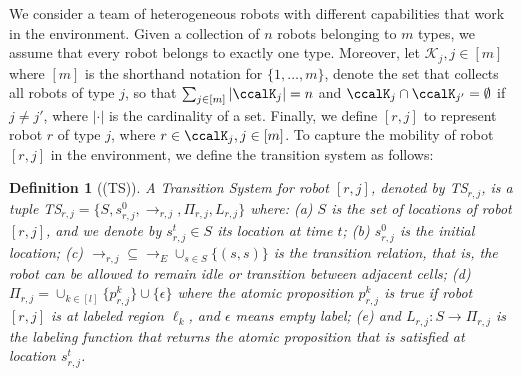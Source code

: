 \documentclass[Afour,sageh,times]{sagej}
\newtheorem{defn}[thm]{Definition}
\begin{document}
 We consider a team of heterogeneous robots with different capabilities that work in the environment. Given a collection of $n$ robots belonging to $m$ types, we assume that every robot belongs to exactly one type. Moreover, let $\mathcal{K}_j, j\in[m]$ where $[m]$ is the shorthand notation for  $\{1,\ldots,m\}$, denote the set that  collects all robots of type $j$, so that $\sum_{j\in [m]} |\ccalK_j| = n$ and $\ccalK_{j} \cap \ccalK_{j'} = \emptyset$ if $j \not= j'$, where $|\cdot|$ is the cardinality of a set. Finally, we define $[r,j]$ to represent robot $r$ of type $j$, where $r\in \ccalK_j, j\in [m]$. To capture the mobility of robot $[r,j]$ in the environment, we define the transition system as follows:

\begin{defn}[(TS)]\label{def:ts}
  A { Transition System} for robot $[r,j]$, denoted by TS$_{r,j}$, is a tuple TS$_{r,j} = \{S, s_{r,j}^0, \to_{r,j}, \Pi_{r,j}, L_{r,j}\}$ where: (a) $S$ is the set of locations of robot $[r,j]$, and we denote by $s_{r,j}^t \in S$ its location at time $t$; (b) $s_{r,j}^0$ is the initial location; (c) $\to_{r,j} \subseteq \to_{E} \cup_{s\in S} \{(s,s)\} $ is the transition relation, that is, the robot can be allowed to remain idle or transition between adjacent cells; (d) $\Pi_{r,j} = \cup_{k\in [l]}\{p_{r,j}^k\} \cup \{\epsilon\}$ where the atomic proposition $p_{r,j}^{k}$ is true if robot $[r,j]$ is at labeled region $\ell_k$, and $\epsilon$ means empty label; (e) and $L_{r,j}: S \to {\Pi_{r,j}} $ is the labeling function that returns the atomic proposition that is satisfied at location $s_{r,j}^t$.
\end{defn}
\end{document}
